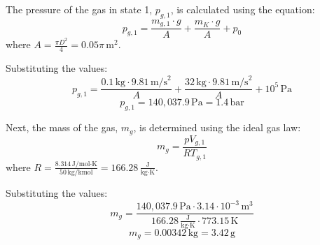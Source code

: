The pressure of the gas in state 1, \( p_{g,1} \), is calculated using the equation:  
\[
p_{g,1} = \frac{m_{g,1} \cdot g}{A} + \frac{m_K \cdot g}{A} + p_0
\]  
where \( A = \frac{\pi D^2}{4} = 0.05 \pi \, \text{m}^2 \).  

Substituting the values:  
\[
p_{g,1} = \frac{0.1 \, \text{kg} \cdot 9.81 \, \text{m/s}^2}{A} + \frac{32 \, \text{kg} \cdot 9.81 \, \text{m/s}^2}{A} + 10^5 \, \text{Pa}
\]  
\[
p_{g,1} = 140,037.9 \, \text{Pa} = 1.4 \, \text{bar}
\]  

Next, the mass of the gas, \( m_g \), is determined using the ideal gas law:  
\[
m_g = \frac{p V_{g,1}}{R T_{g,1}}
\]  
where \( R = \frac{8.314 \, \text{J/mol·K}}{50 \, \text{kg/kmol}} = 166.28 \, \frac{\text{J}}{\text{kg·K}} \).  

Substituting the values:  
\[
m_g = \frac{140,037.9 \, \text{Pa} \cdot 3.14 \cdot 10^{-3} \, \text{m}^3}{166.28 \, \frac{\text{J}}{\text{kg·K}} \cdot 773.15 \, \text{K}}
\]  
\[
m_g = 0.00342 \, \text{kg} = 3.42 \, \text{g}
\]